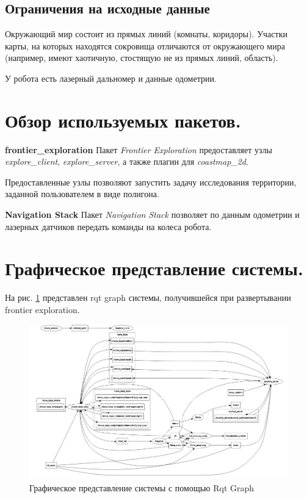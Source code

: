 \documentclass[14pt, a4paper]{extarticle}
\begin{document}
	\subsection{Ограничения на исходные данные}	
	Окружающий мир состоит из прямых линий (комнаты, коридоры). Участки карты, на которых находятся сокровища отличаются от окружающего мира (например, имеют хаотичную, стостящую не из прямых линий, область).
	
	У робота есть лазерный дальномер и данные одометрии.
	
	\section{Обзор используемых пакетов.}
	\textbf{frontier\_exploration}
	Пакет \textit{Frontier Exploration} предоставляет узлы \textit{explore\_client}, \textit{explore\_server}, а также плагин для \textit{coastmap\_2d}.
	
	Предоставленные узлы позволяют запустить задачу исследования территории, заданной пользователем в виде полигона.
	
	\textbf{Navigation Stack}
	Пакет \textit{Navigation Stack} позволяет по данным одометрии и лазерных датчиков передать команды на колеса робота.
	
	\section{Графическое представление системы.}
	На рис. \ref{fig:rqt} представлен rqt graph системы, получившейся при развертывании frontier exploration.
		
	\begin{figure}[h]
		\centering
		\includegraphics[width=\textwidth]{rqt}
		\caption{Графическое представление системы с помощью Rqt Graph}
		\label{fig:rqt}
	\end{figure}
\end{document}
